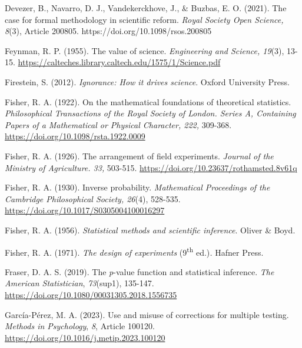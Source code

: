 \documentclass[authordate, empirical]{jote-new-article}
\begin{document}
	Devezer, B., Navarro, D. J., Vandekerckhove, J., \& Buzbas, E. O. (2021). The case for formal methodology in scientific reform. \emph{Royal Society Open Science, 8}(3), Article 200805. https://doi.org/10.1098/rsos.200805



	Feynman, R. P. (1955). The value of science. \emph{Engineering and Science, 19}(3), 13-15. \href{https://calteches.library.caltech.edu/1575/1/Science.pdf}{https://calteches.library.caltech.edu/1575/1/Science.pdf}



	Firestein, S. (2012). \emph{Ignorance: How it drives science}. Oxford University Press.



	Fisher, R. A. (1922). On the mathematical foundations of theoretical statistics. \emph{Philosophical Transactions of the Royal Society of London. Series A, Containing Papers of a Mathematical or Physical Character, 222,} 309-368. \href{https://doi.org/10.1098/rsta.1922.0009}{https://doi.org/10.1098/rsta.1922.0009}



	Fisher, R. A. (1926). The arrangement of field experiments. \emph{Journal of the Ministry of Agriculture. 33, }503-515. \href{https://doi.org/10.23637/rothamsted.8v61q}{https://doi.org/10.23637/rothamsted.8v61q}



	Fisher, R. A. (1930). Inverse probability. \emph{Mathematical Proceedings of the Cambridge Philosophical Society, 26}(4), 528-535. \href{https://doi.org/10.1017/S0305004100016297}{https://doi.org/10.1017/S0305004100016297}



	Fisher, R. A. (1956). \emph{Statistical methods and scientific inference}. Oliver \& Boyd.



	Fisher, R. A. (1971). \emph{The design of experiments }(9\textsuperscript{th} ed.)\emph{.} Hafner Press.



	Fraser, D. A. S. (2019). The \emph{p}-value function and statistical inference. \emph{The American Statistician}, \emph{73}(sup1), 135-147. \href{https://doi.org/10.1080/00031305.2018.1556735}{https://doi.org/10.1080/00031305.2018.1556735}



	García-Pérez, M. A. (2023). Use and misuse of corrections for multiple testing. \emph{Methods in Psychology}, \emph{8}, Article 100120. \href{https://doi.org/10.1016/j.metip.2023.100120}{https://doi.org/10.1016/j.metip.2023.100120}
\end{document}
